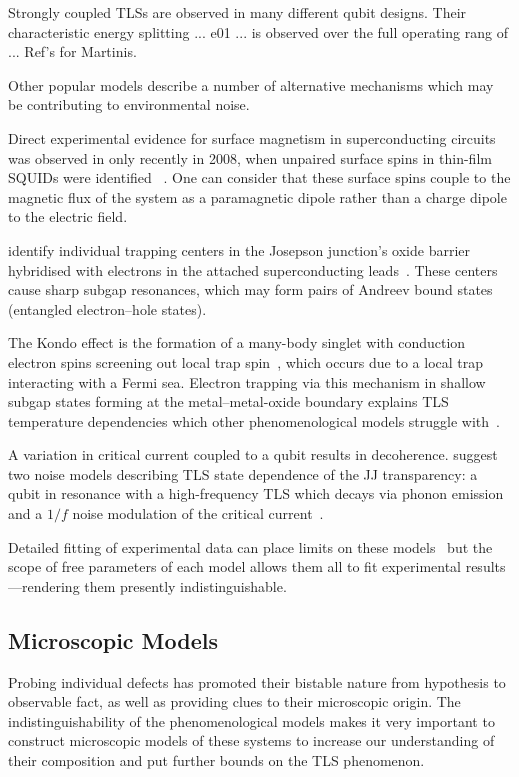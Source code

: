 Strongly coupled TLSs are observed in many different qubit designs.
Their characteristic energy splitting ... e01 ... is observed over the full operating rang of ... 
Ref's for Martinis.

\divtext

Other popular models describe a number of alternative mechanisms which may be contributing to environmental noise. 

Direct experimental evidence for surface magnetism in superconducting circuits was observed in only recently in 2008, when unpaired surface spins in thin-film SQUIDs were identified ~\cite{Sendelbach2008}.
One can consider that these surface spins couple to the magnetic flux of the system as a paramagnetic dipole rather than a charge dipole to the electric field.

\citeauthor{DeSousa2009} identify individual trapping centers in the Josepson junction's oxide barrier hybridised with electrons in the attached superconducting leads~\cite{DeSousa2009}.
These centers cause sharp subgap resonances, which may form pairs of Andreev bound states (entangled electron--hole states).

The Kondo effect is  the formation of a many-body singlet with conduction electron spins screening out local trap spin~\cite{Wilson1975}, which occurs due to a local trap interacting with a Fermi sea.
Electron trapping via this mechanism in shallow subgap states forming at the metal--metal-oxide boundary explains TLS temperature dependencies which other phenomenological models struggle with~\cite{Faoro2007}.

A variation in critical current coupled to a qubit results in decoherence.
\citeauthor{Ku2005} suggest two noise models describing TLS state dependence of the JJ transparency: a qubit in resonance with a high-frequency TLS which decays via phonon emission and a $1/f$ noise modulation of the critical current~\cite{Ku2005}.

Detailed fitting of experimental data can place limits on these models~\cite{Cole2010} but the scope of free parameters of each model allows them all to fit experimental results---rendering them presently indistinguishable.

\subsection{Microscopic Models}\label{sec:micromod}

Probing individual defects has promoted their bistable nature from hypothesis to observable fact, as well as providing clues to their microscopic origin.
The indistinguishability of the phenomenological models makes it very important to construct microscopic models of these systems to increase our understanding of their composition and put further bounds on the TLS phenomenon.

